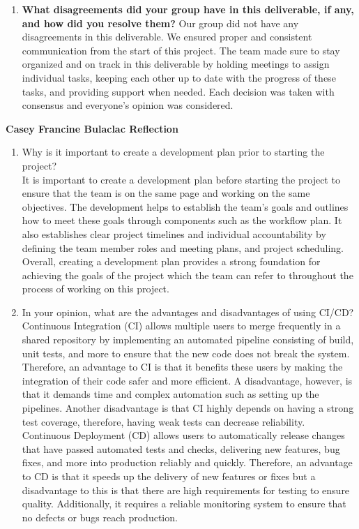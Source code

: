\documentclass{article}
\begin{document}
\begin{enumerate}
\begin{enumerate}
    \item \textbf{What disagreements did your group have in this deliverable, if any,
    and how did you resolve them?}\newline
    Our group did not have any disagreements in this deliverable. We ensured proper and consistent communication from the start of this project. The team made sure to stay organized and on track in this deliverable
    by holding meetings to assign individual tasks, keeping each other up to date with the progress of these tasks, and providing support when needed. Each decision was taken with consensus and everyone's opinion was considered.
\end{enumerate}

\textbf{Casey Francine Bulaclac Reflection}

\begin{enumerate}
    \item Why is it important to create a development plan prior to starting the
    project? \\[1ex]
    It is important to create a development plan before starting the project to ensure that 
    the team is on the same page and working on the same objectives. The development helps to establish 
    the team's goals and outlines how to meet these goals through components such as the workflow plan. 
    It also establishes clear project timelines and individual accountability by 
    defining the team member roles and meeting plans, and project scheduling.
    Overall, creating a development plan provides a strong foundation for achieving the goals
    of the project which the team can refer to throughout the process of working on this project.
    \item In your opinion, what are the advantages and disadvantages of using CI/CD? \\[1ex]
    Continuous Integration (CI) allows multiple users to merge frequently in a shared repository by 
    implementing an automated pipeline consisting of build, unit tests, and more to 
    ensure that the new code does not break the system. Therefore, an advantage to CI is 
    that it benefits these users by making the integration of their code safer and 
    more efficient. A disadvantage, however, is that it demands time and complex automation such as 
    setting up the pipelines. Another disadvantage is that CI highly depends on having a 
    strong test coverage, therefore, having weak tests can decrease reliability. \\
    Continuous Deployment (CD) allows users to automatically release changes that have 
    passed automated tests and checks, delivering new features, bug fixes, and more into 
    production reliably and quickly. Therefore, an advantage to CD is that it speeds up 
    the delivery of new features or fixes but a disadvantage to this is that there are 
    high requirements for testing to ensure quality. Additionally, it requires a reliable 
    monitoring system to ensure that no defects or bugs reach production.


\end{enumerate}
\end{enumerate}
\end{document}
